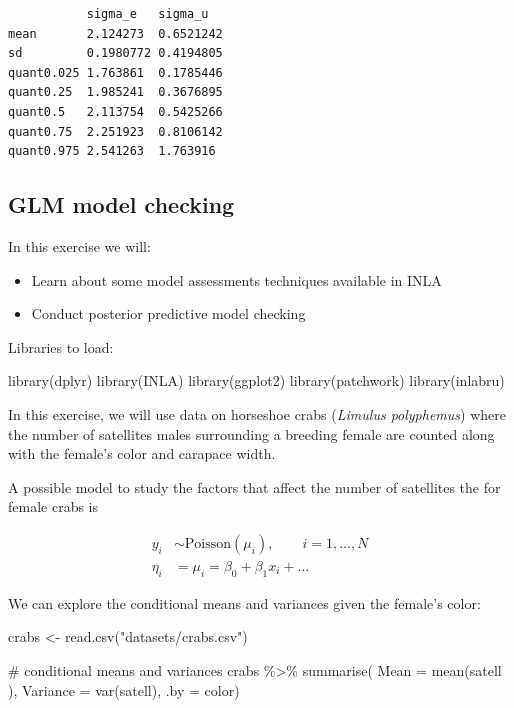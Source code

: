 \documentclass[
  letterpaper,
  DIV=11,
  numbers=noendperiod]{scrartcl}
\newenvironment{Shaded}{\begin{snugshade}}{\end{snugshade}}
\newcommand{\AttributeTok}[1]{\textcolor[rgb]{0.40,0.45,0.13}{#1}}
\newcommand{\CommentTok}[1]{\textcolor[rgb]{0.37,0.37,0.37}{#1}}
\newcommand{\FunctionTok}[1]{\textcolor[rgb]{0.28,0.35,0.67}{#1}}
\newcommand{\NormalTok}[1]{\textcolor[rgb]{0.00,0.23,0.31}{#1}}
\newcommand{\OtherTok}[1]{\textcolor[rgb]{0.00,0.23,0.31}{#1}}
\newcommand{\SpecialCharTok}[1]{\textcolor[rgb]{0.37,0.37,0.37}{#1}}
\newcommand{\StringTok}[1]{\textcolor[rgb]{0.13,0.47,0.30}{#1}}
\providecommand{\tightlist}{%
  \setlength{\itemsep}{0pt}\setlength{\parskip}{0pt}}\usepackage{longtable,booktabs,array}
\begin{document}
\begin{tcolorbox}
\begin{verbatim}
           sigma_e   sigma_u  
mean       2.124273  0.6521242
sd         0.1980772 0.4194805
quant0.025 1.763861  0.1785446
quant0.25  1.985241  0.3676895
quant0.5   2.113754  0.5425266
quant0.75  2.251923  0.8106142
quant0.975 2.541263  1.763916 
\end{verbatim}

\end{tcolorbox}

\subsection{GLM model checking}\label{sec-linmodel}

In this exercise we will:

\begin{itemize}
\tightlist
\item
  Learn about some model assessments techniques available in INLA
\item
  Conduct posterior predictive model checking
\end{itemize}

Libraries to load:

\begin{Shaded}
\begin{Highlighting}[]
\FunctionTok{library}\NormalTok{(dplyr)}
\FunctionTok{library}\NormalTok{(INLA)}
\FunctionTok{library}\NormalTok{(ggplot2)}
\FunctionTok{library}\NormalTok{(patchwork)}
\FunctionTok{library}\NormalTok{(inlabru)     }
\end{Highlighting}
\end{Shaded}

In this exercise, we will use data on horseshoe crabs (\emph{Limulus
polyphemus}) where the number of satellites males surrounding a breeding
female are counted along with the female's color and carapace width.

A possible model to study the factors that affect the number of
satellites the for female crabs is

\[
\begin{aligned}
y_i&\sim\mathrm{Poisson}(\mu_i), \qquad i = 1,\dots,N \\
\eta_i &= \mu_i = \beta_0 + \beta_1 x_i + \ldots
\end{aligned}
\]

We can explore the conditional means and variances given the female's
color:

\begin{Shaded}
\begin{Highlighting}[]
\NormalTok{crabs }\OtherTok{\textless{}{-}} \FunctionTok{read.csv}\NormalTok{(}\StringTok{"datasets/crabs.csv"}\NormalTok{)}

\CommentTok{\# conditional means and variances}
\NormalTok{crabs }\SpecialCharTok{\%\textgreater{}\%}
  \FunctionTok{summarise}\NormalTok{( }\AttributeTok{Mean =} \FunctionTok{mean}\NormalTok{(satell ),}
             \AttributeTok{Variance =} \FunctionTok{var}\NormalTok{(satell),}
                     \AttributeTok{.by =}\NormalTok{ color)}
\end{Highlighting}
\end{Shaded}
\end{document}

